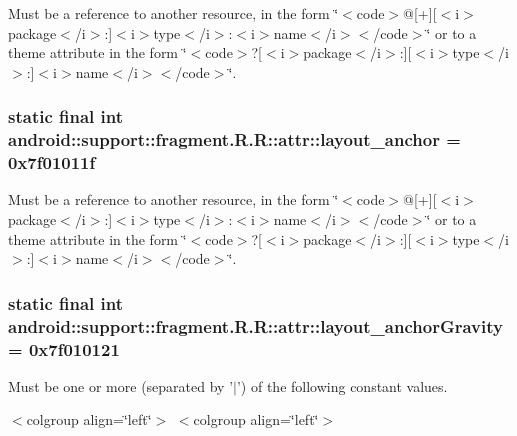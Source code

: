 Must be a reference to another resource, in the form \char`\"{}$<$code$>$@\mbox{[}+\mbox{]}\mbox{[}$<$i$>$package$<$/i$>$:\mbox{]}$<$i$>$type$<$/i$>$:$<$i$>$name$<$/i$>$$<$/code$>$\char`\"{} or to a theme attribute in the form \char`\"{}$<$code$>$?\mbox{[}$<$i$>$package$<$/i$>$:\mbox{]}\mbox{[}$<$i$>$type$<$/i$>$:\mbox{]}$<$i$>$name$<$/i$>$$<$/code$>$\char`\"{}. \hypertarget{classandroid_1_1support_1_1fragment_1_1_r_1_1attr_9f1fffa5b4eba1befa4a60c3a6f299d5}{
\subsubsection[{layout\_\-anchor}]{\setlength{\rightskip}{0pt plus 5cm}static final int android::support::fragment.R.R::attr::layout\_\-anchor = 0x7f01011f}}
\label{classandroid_1_1support_1_1fragment_1_1_r_1_1attr_9f1fffa5b4eba1befa4a60c3a6f299d5}


Must be a reference to another resource, in the form \char`\"{}$<$code$>$@\mbox{[}+\mbox{]}\mbox{[}$<$i$>$package$<$/i$>$:\mbox{]}$<$i$>$type$<$/i$>$:$<$i$>$name$<$/i$>$$<$/code$>$\char`\"{} or to a theme attribute in the form \char`\"{}$<$code$>$?\mbox{[}$<$i$>$package$<$/i$>$:\mbox{]}\mbox{[}$<$i$>$type$<$/i$>$:\mbox{]}$<$i$>$name$<$/i$>$$<$/code$>$\char`\"{}. \hypertarget{classandroid_1_1support_1_1fragment_1_1_r_1_1attr_7581b103306e312e2a1f3601a1218c42}{
\subsubsection[{layout\_\-anchorGravity}]{\setlength{\rightskip}{0pt plus 5cm}static final int android::support::fragment.R.R::attr::layout\_\-anchorGravity = 0x7f010121}}
\label{classandroid_1_1support_1_1fragment_1_1_r_1_1attr_7581b103306e312e2a1f3601a1218c42}


Must be one or more (separated by '$|$') of the following constant values. \begin{TabularC}{0}
\hline
\end{TabularC}
$<$colgroup align=\char`\"{}left\char`\"{}$>$ $<$colgroup align=\char`\"{}left\char`\"{}$>$ 

